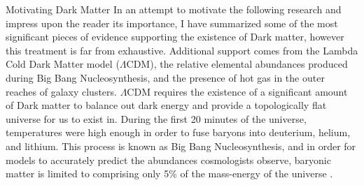 \documentclass[a4paper,11pt]{article}
\begin{document}
\begin{section}{Motivating Dark Matter}
    In an attempt to motivate the following research and impress upon the reader its importance,  I have summarized some of the most significant pieces of evidence supporting the existence of Dark matter, however this treatment is far from exhaustive.
    Additional support comes from the Lambda Cold Dark Matter model ($\Lambda$CDM), the relative elemental abundances produced during Big Bang Nucleosynthesis, and the presence of hot gas in the outer reaches of galaxy clusters. 
    $\Lambda$CDM requires the existence of a significant amount of Dark matter to balance out dark energy and provide a topologically flat universe for us to exist in.
    During the first 20 minutes of the universe, temperatures were high enough in order to fuse baryons into deuterium, helium, and lithium.
    This process is known as Big Bang Nucleosynthesis, and in order for models to accurately predict the abundances cosmologists observe, baryonic matter is limited to comprising only 5\% of the mass-energy of the universe \cite{Coc:2004}.
\end{section}
\end{document}
